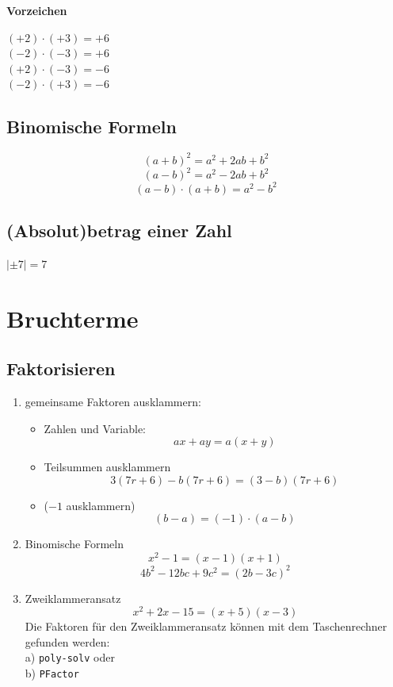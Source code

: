 \begin{multicols}{2}
\textbf{Vorzeichen}

$(+2)\cdot(+3)=+6$\\
$(-2)\cdot(-3)=+6$\\
$(+2)\cdot(-3)=-6$\\
$(-2)\cdot(+3)=-6$\\



\subsection*{Binomische Formeln}
$$(a+b)^2 = a^2+2ab + b^2$$%
$$(a-b)^2=a^2-2ab+b^2$$%
$$(a-b)\cdot(a+b) = a^2 - b^2$$

\subsection*{(Absolut)betrag einer Zahl}

$|\pm7| = 7$

\TRAINER{Intervall-Schreibweise? \zB $a\in[0;1[$}

\section*{Bruchterme}
\subsection*{Faktorisieren}

\begin{enumerate}
\item gemeinsame Faktoren ausklammern:
\begin{itemize}
\item Zahlen und Variable:
$$ax + ay = a(x+y)$$
\item
Teilsummen ausklammern
$$3(7r+6) - b(7r+6) = (3-b)(7r+6)$$
\item ($-1$ ausklammern)
$$(b-a)=(-1)\cdot{}(a-b)$$
\end{itemize}

\item Binomische Formeln
$$x^2-1 = (x-1)(x+1)$$
$$4b^2 -12bc + 9c^2=(2b-3c)^2$$
\item Zweiklammeransatz
$$x^2+2x-15 = (x+5)(x-3)$$
Die Faktoren für den Zweiklammeransatz können mit dem Taschenrechner
gefunden werden:\\ a) \texttt{poly-solv} 
oder\\ b) \texttt{PFactor} 


\end{enumerate}
\end{multicols}
